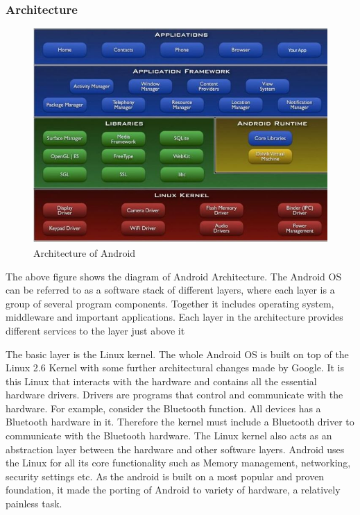 \documentclass[12pt,a4paper,oneside]{report}
\begin{document}
\subsubsection{Architecture}
\begin{figure}[h]
\begin{center}
\includegraphics[width=.7\textwidth]{arch.jpg}
\caption{Architecture of Android}
\end{center}
\end{figure}

The above figure shows the diagram of Android Architecture. The Android OS can be referred to as a software stack of different layers, where each layer is a group of several program components. Together it includes operating system, middleware and important applications. Each layer in the architecture provides different services to the layer just above it

\par
The basic layer is the Linux kernel. The whole Android OS is built on top of the Linux 2.6 Kernel with some further architectural changes made by Google. It is this Linux that interacts with the hardware and contains all the essential hardware drivers. Drivers are programs that control and communicate with the hardware. For example, consider the Bluetooth function. All devices has a Bluetooth hardware in it. Therefore the kernel must include a Bluetooth driver to communicate with the Bluetooth hardware. The Linux kernel also acts as an abstraction layer between the hardware and other software layers. Android uses the Linux for all its core functionality such as Memory management, networking, security settings etc. As the android is built on a most popular and proven foundation, it made the porting of Android to variety of hardware, a relatively painless task.
\end{document}
